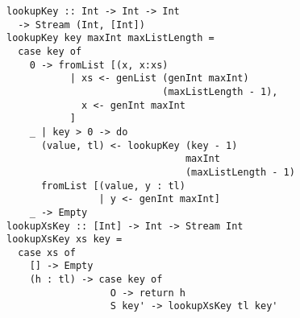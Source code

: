 \begin{figure}[!t]
  \centering
  \begin{minipage}{0.49\textwidth}
    \begin{lstlisting}[label={lookup}, caption={Functional implementations for a \lstinline{lookupo out in out} and \lstinline{lookupo in in out} directions}, captionpos=b, frame=tb]
lookupKey :: Int -> Int -> Int
  -> Stream (Int, [Int])
lookupKey key maxInt maxListLength =
  case key of
    0 -> fromList [(x, x:xs)
           | xs <- genList (genInt maxInt)
                           (maxListLength - 1),
             x <- genInt maxInt
           ]
    _ | key > 0 -> do
      (value, tl) <- lookupKey (key - 1)
                               maxInt
                               (maxListLength - 1)
      fromList [(value, y : tl)
                | y <- genInt maxInt]
    _ -> Empty
lookupXsKey :: [Int] -> Int -> Stream Int
lookupXsKey xs key =
  case xs of
    [] -> Empty
    (h : tl) -> case key of
                  O -> return h
                  S key' -> lookupXsKey tl key'
    \end{lstlisting}
  \end{minipage}
\end{figure}

